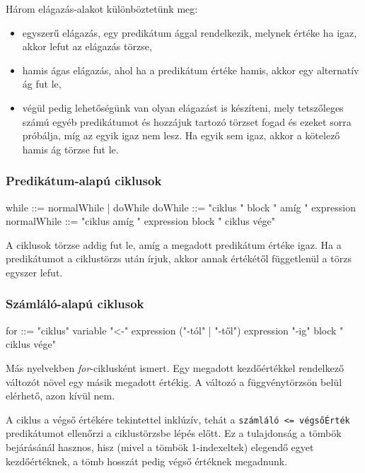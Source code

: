 Három elágazás-alakot különböztetünk meg:

\begin{itemize}
    \item egyszerű elágazás, egy predikátum ággal rendelkezik, melynek értéke ha igaz, akkor lefut az elágazás törzse,
    \item hamis ágas elágazás, ahol ha a predikátum értéke hamis, akkor egy alternatív ág fut le,
    \item végül pedig lehetőségünk van olyan elágazást is készíteni, mely tetszőleges számú egyéb predikátumot és hozzájuk tartozó törzset fogad és ezeket sorra próbálja, míg az egyik igaz nem lesz. Ha egyik sem igaz, akkor a kötelező hamis ág törzse fut le.
\end{itemize}

\subsubsection{Predikátum-alapú ciklusok}
\label{whileciklus}

\begin{ebnf}
while ::= normalWhile | doWhile
doWhile ::= "ciklus " block " amíg " expression
normalWhile ::= "ciklus amíg " expression block " ciklus vége"
\end{ebnf}

A ciklusok törzse addig fut le, amíg a megadott predikátum értéke igaz. Ha a predikátumot a ciklustörzs után írjuk, akkor annak értékétől függetlenül a törzs egyszer lefut.

\subsubsection{Számláló-alapú ciklusok}
\label{forciklus}

\begin{ebnf}
for ::= "ciklus" variable "<-" expression ("-tól" | "-től") expression "-ig" block " ciklus vége"
\end{ebnf}

Más nyelvekben \textit{for}-ciklusként ismert. Egy megadott kezdőértékkel rendelkező változót növel egy másik megadott értékig. A változó a függvénytörzsön belül elérhető, azon kívül nem.

A ciklus a végső értékére tekintettel inklúzív, tehát a \texttt{számláló <= végsőÉrték} predikátumot ellenőrzi a ciklustörzsbe lépés előtt. Ez a tulajdonság a tömbök bejárásánál hasznos, hisz (mivel a tömbök 1-indexeltek) elegendő egyet kezdőértéknek, a tömb hosszát pedig végső értéknek megadnunk. 

